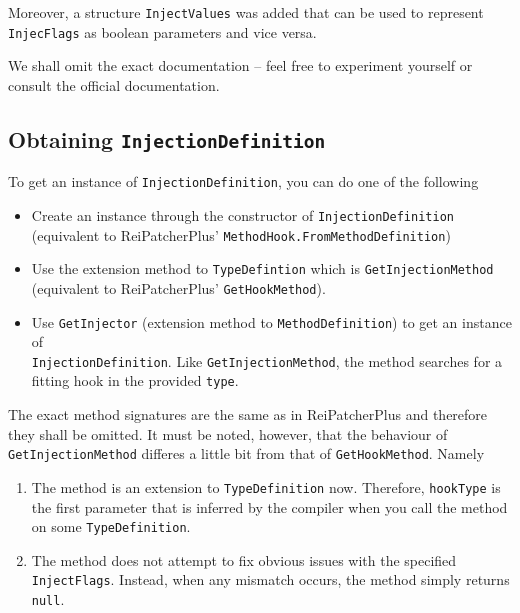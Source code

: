 \documentclass[a4paper,11pt]{article}
\begin{document}
Moreover, a structure \texttt{InjectValues} was added that can be used to represent \texttt{InjecFlags} as boolean parameters and vice versa.

We shall omit the exact documentation -- feel free to experiment yourself or consult the official documentation.

\subsection{Obtaining \texttt{InjectionDefinition}}
To get an instance of \texttt{InjectionDefinition}, you can do one of the following
\begin{itemize}
\item Create an instance through the constructor of \texttt{InjectionDefinition} 
\\ (equivalent to ReiPatcherPlus' \texttt{MethodHook.FromMethodDefinition})
\item Use the extension method to \texttt{TypeDefintion} which is \texttt{GetInjectionMethod} (equivalent to ReiPatcherPlus' \texttt{GetHookMethod}).
\item Use \texttt{GetInjector} (extension method to \texttt{MethodDefinition}) to get an instance of \\ \texttt{InjectionDefinition}. Like \texttt{GetInjectionMethod}, the method searches for a fitting hook in the provided \texttt{type}.
\end{itemize}
The exact method signatures are the same as in ReiPatcherPlus and therefore they shall be omitted. It must be noted, however, that the behaviour of \texttt{GetInjectionMethod} differes a little bit from that of \texttt{GetHookMethod}. Namely
\begin{enumerate}
\item The method is an extension to \texttt{TypeDefinition} now. Therefore, \texttt{hookType} is the first parameter that is inferred by the compiler when you call the method on some \texttt{TypeDefinition}.
\item The method does not attempt to fix obvious issues with the specified \texttt{InjectFlags}. Instead, when any mismatch occurs, the method simply returns \texttt{null}.
\end{enumerate}
\end{document}
